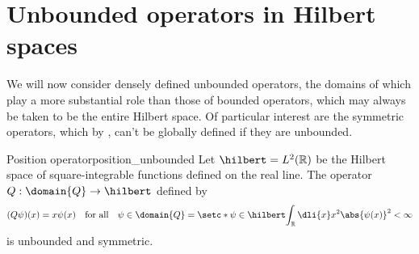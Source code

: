 \section{Unbounded operators in Hilbert spaces}
We will now consider densely defined unbounded operators, the domains of which play a more substantial role than those of bounded operators, which may always be taken to be the entire Hilbert space. Of particular interest are the symmetric operators, which by , can't be globally defined if they are unbounded.
\begin{example}{Position operator}{position_unbounded}
    Let \(\hilbert = L^2(\mathbb{R})\) be the Hilbert space of square-integrable functions defined on the real line. The operator \(Q : \domain{Q} \to \hilbert\) defined by 
    \begin{equation*}
        (Q\psi)(x) = x\psi(x)
        \quad\text{for all}\quad
        \psi \in \domain{Q} = \setc*{\psi \in \hilbert}{\int_{\mathbb{R}}\dli{x} x^2 \abs{\psi(x)}^2 < \infty}
    \end{equation*}
    is unbounded and symmetric.
\end{example}
